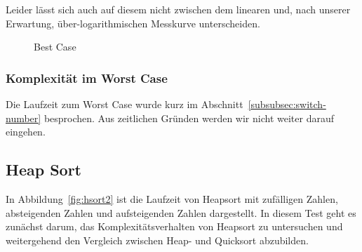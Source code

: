 Leider lässt sich auch auf diesem nicht zwischen dem linearen und, nach
unserer Erwartung, über-logarithmischen Messkurve unterscheiden.

\begin{figure}[hbt]
    \centering
    \caption{Best Case}
\end{figure}

\subsubsection{Komplexität im Worst Case}\label{subsubsec:worst-case}
Die Laufzeit zum Worst Case wurde kurz im
Abschnitt~\ref{subsubsec:switch-number} besprochen.
Aus zeitlichen Gründen werden wir nicht weiter darauf eingehen.


\FloatBarrier

\subsection{Heap Sort}\label{subsec:heap-sort-laufzeit}

In Abbildung~\ref{fig:hsort2} ist die Laufzeit von Heapsort mit zufälligen
Zahlen, absteigenden Zahlen und aufsteigenden Zahlen dargestellt.
In diesem Test geht es zunächst darum, das Komplexitätsverhalten von Heapsort
zu untersuchen und weitergehend den Vergleich zwischen Heap- und Quicksort
abzubilden.

